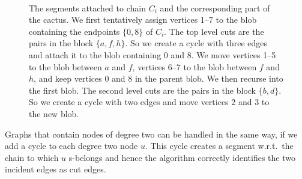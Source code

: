 \documentclass[paper=a4]{scrartcl}
\newcommand{\sset}[1]{\{ #1 \}}
\begin{document}
\begin{figure}[t]
\centering
{}\\\vspace{5ex}
\caption{\label{fig:cactus} The segments attached to chain $C_i$ and the corresponding part of the cactus. We first tentatively assign vertices 1--7 to the blob containing the endpoints $\{0,8\}$ of $C_i$. The top level cuts  are the pairs in the block $\sset{a,f,h}$. So we create a cycle with three edges and attach it to the blob containing 0 and 8. We move vertices 1--5 to the blob between $a$ and $f$, vertices 6--7 to the blob between $f$ and $h$, and keep vertices $0$ and $8$ in the parent blob. We then recurse into the first blob. The second level cuts are the pairs in the block $\sset{b,d}$. So we create a cycle with two edges and move vertices 2 and 3 to the new blob.}
\end{figure}

Graphs that contain nodes of degree two can be handled in the same way, if we add a cycle to each degree two node $u$. This cycle creates a segment w.r.t.\ the chain to which $u$ s-belongs and hence the algorithm correctly identifies the two incident edges as cut edges.
\end{document}
